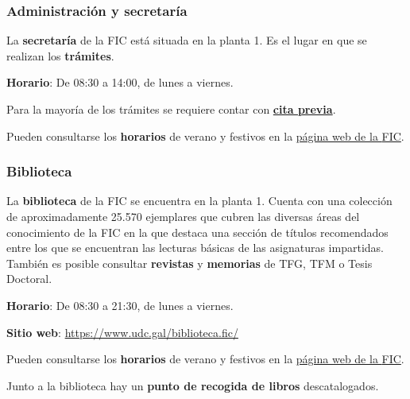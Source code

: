 \subsubsection{Administración y secretaría}

La \textbf{secretaría} de la \acrshort{FIC} está situada en la planta 1. Es el lugar en que se realizan los \textbf{trámites}.

\textbf{Horario}: De 08:30 a 14:00, de lunes a viernes.

\begin{warningBox}
    Para la mayoría de los trámites se requiere contar con  \href{https://outlook.office365.com/book/UNIVERSIDADEDACORUA8@udcgal.onmicrosoft.com/}{\textbf{cita previa}}.
\end{warningBox}

\begin{infoBox}
    Pueden consultarse los \textbf{horarios} de verano y festivos en la \href{https://www.fic.udc.es/gl/horario}{página web de la \acrshort{FIC}}.
\end{infoBox}

\subsubsection{Biblioteca}

La \textbf{biblioteca} de la \acrshort{FIC} se encuentra en la planta 1. Cuenta con una colección de aproximadamente 25.570 ejemplares que cubren las diversas áreas del conocimiento de la \acrshort{FIC} en la que destaca una sección de títulos recomendados entre los que se encuentran las lecturas básicas de las asignaturas impartidas. También es posible consultar \textbf{revistas} y \textbf{memorias} de \acrlong{TFG}, \acrlong{TFM} o Tesis Doctoral.

\textbf{Horario}: De 08:30 a 21:30, de lunes a viernes.

\textbf{Sitio web}: \url{https://www.udc.gal/biblioteca.fic/}

\begin{infoBox}
    Pueden consultarse los \textbf{horarios} de verano y festivos en la \href{https://www.fic.udc.es/gl/biblioteca-0}{página web de la \acrshort{FIC}}.
\end{infoBox}

\begin{curiosityBox}
    Junto a la biblioteca hay un \textbf{punto de recogida de libros} descatalogados.
\end{curiosityBox}

